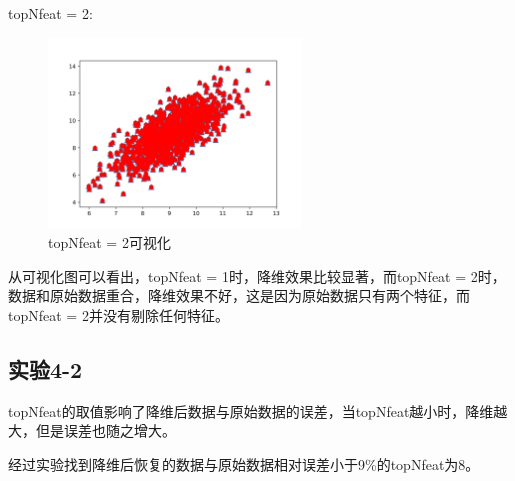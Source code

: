 \documentclass{../source/Experiment}
\begin{document}
topNfeat = 2:
\begin{figure}[H]
    \centering
    \includegraphics[width = 0.6\textwidth]{Part4/4-1-topNfeat(2).png}
    \caption{topNfeat = 2可视化}
\end{figure}

从可视化图可以看出，topNfeat = 1时，降维效果比较显著，而topNfeat = 2时，数据和原始数据重合，降维效果不好，这是因为原始数据只有两个特征，而topNfeat = 2并没有剔除任何特征。

\subsection{实验4-2}
topNfeat的取值影响了降维后数据与原始数据的误差，当topNfeat越小时，降维越大，但是误差也随之增大。

经过实验找到降维后恢复的数据与原始数据相对误差小于9\%的topNfeat为8。
\end{document}
